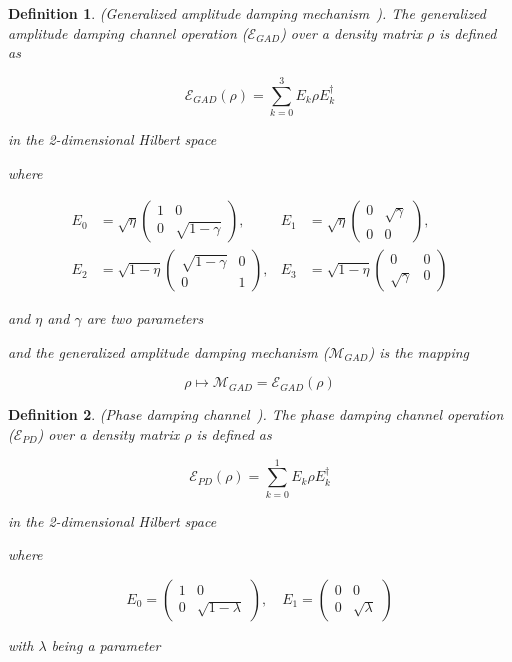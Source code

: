 \documentclass{ieeeaccess}
\newtheorem{definition}{Definition}[section]
\begin{document}
\begin{definition}
    (Generalized amplitude damping mechanism~\cite{zhou2017differential}). The generalized amplitude damping channel operation ($\mathcal{E}_{GAD}$) over a density matrix $\rho$ is defined as 

    \[
      \mathcal{E}_{GAD}(\rho) = \sum_{k = 0}^{3}E_{k}\rho E_{k}^{\dagger}
    \]

    in the 2-dimensional Hilbert space

    where

    \begin{align*}
      E_0 &= \sqrt{\eta}\begin{pmatrix} 1 & 0 \\ 0 & \sqrt{1-\gamma} \end{pmatrix}, &
      E_1 &= \sqrt{\eta}\begin{pmatrix} 0 & \sqrt{\gamma} \\ 0 & 0 \end{pmatrix}, \\
      E_2 &= \sqrt{1-\eta}\begin{pmatrix} \sqrt{1-\gamma} & 0 \\ 0 & 1 \end{pmatrix}, &
      E_3 &= \sqrt{1-\eta}\begin{pmatrix} 0 & 0 \\ \sqrt{\gamma} & 0 \end{pmatrix}
    \end{align*}

    and $\eta$ and $\gamma$ are two parameters

    and the generalized amplitude damping mechanism ($\mathcal{M}_{GAD}$) is the mapping

    \[
      \rho \mapsto \mathcal{M}_{GAD} = \mathcal{E}_{GAD}(\rho)
    \]
    \label{def:gad}
\end{definition}

\begin{definition}
    (Phase damping channel~\cite{zhou2017differential}). The phase damping channel operation ($\mathcal{E}_{PD}$) over a density matrix $\rho$ is defined as

    \[
      \mathcal{E}_{PD}(\rho) = \sum_{k = 0}^{1}E_{k}\rho E_{k}^{\dagger}
    \]

    in the 2-dimensional Hilbert space 

    where

    \[
      E_0 = \begin{pmatrix} 1 & 0 \\ 0 & \sqrt{1-\lambda} \end{pmatrix}, \quad
      E_1 = \begin{pmatrix} 0 & 0 \\ 0 & \sqrt{\lambda} \end{pmatrix}
    \]

    with $\lambda$ being a parameter
    \label{def:phase_damping}
\end{definition}
\end{document}
